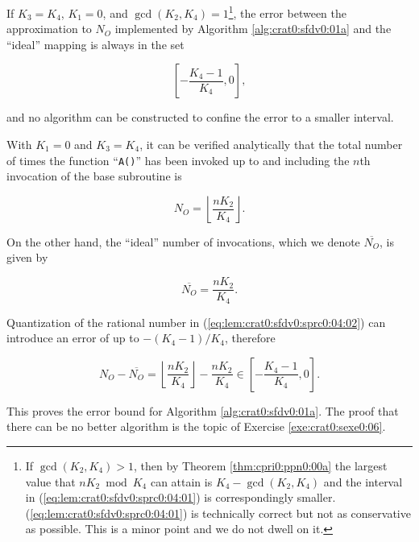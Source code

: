 \begin{vworklemmastatement}
\label{lem:crat0:sfdv0:sprc0:04}
If $K_3=K_4$, $K_1=0$, and 
$\gcd(K_2, K_4)=1$\footnote{\label{footnote:lem:crat0:sfdv0:sprc0:04:01}If
$\gcd(K_2, K_4) > 1$, then by Theorem
\cprizeroxrefhyphen\ref{thm:cpri0:ppn0:00a} the largest 
value that $n K_2 \bmod K_4$ can attain is 
$K_4-\gcd(K_2, K_4)$ and the interval in
(\ref{eq:lem:crat0:sfdv0:sprc0:04:01}) is correspondingly
smaller.  (\ref{eq:lem:crat0:sfdv0:sprc0:04:01}) is
technically correct but not as conservative as possible.
This is a minor point and we do not dwell on it.}, the error between
the approximation to $N_O$ implemented by
Algorithm \ref{alg:crat0:sfdv0:01a} and the ``ideal'' mapping is always
in the set

\begin{equation}
\label{eq:lem:crat0:sfdv0:sprc0:04:01}
\left[ - \frac{K_4 - 1}{K_4} , 0 \right] ,
\end{equation}

and no algorithm can be constructed to 
confine the error to a smaller interval.
\end{vworklemmastatement}
\begin{vworklemmaproof}
With $K_1=0$ and $K_3 = K_4$, it can be verified analytically that
the total number of times the function ``\texttt{A()}'' has been
invoked up to and including the $n$th invocation of the base subroutine
is 

\begin{equation}
\label{eq:lem:crat0:sfdv0:sprc0:04:02}
N_O = \left\lfloor \frac{n K_2}{K_4} \right\rfloor .
\end{equation}

On the other hand, the ``ideal'' number of invocations, which
we denote $\overline{N_O}$, is given by

\begin{equation}
\label{eq:lem:crat0:sfdv0:sprc0:04:03}
\overline{N_O} = \frac{n K_2}{K_4} .
\end{equation}

Quantization of the rational number in (\ref{eq:lem:crat0:sfdv0:sprc0:04:02})
can introduce an error of up to $-(K_4-1)/K_4$, therefore

\begin{equation}
\label{eq:lem:crat0:sfdv0:sprc0:04:04}
N_O - \overline{N_O} =
\left\lfloor \frac{n K_2}{K_4} \right\rfloor - \frac{n K_2}{K_4} 
\in \left[ - \frac{K_4 - 1}{K_4} , 0 \right] .
\end{equation}

This proves the error bound for Algorithm \ref{alg:crat0:sfdv0:01a}.
The proof that there can be no better algorithm is the topic
of Exercise \ref{exe:crat0:sexe0:06}.
\end{vworklemmaproof}
